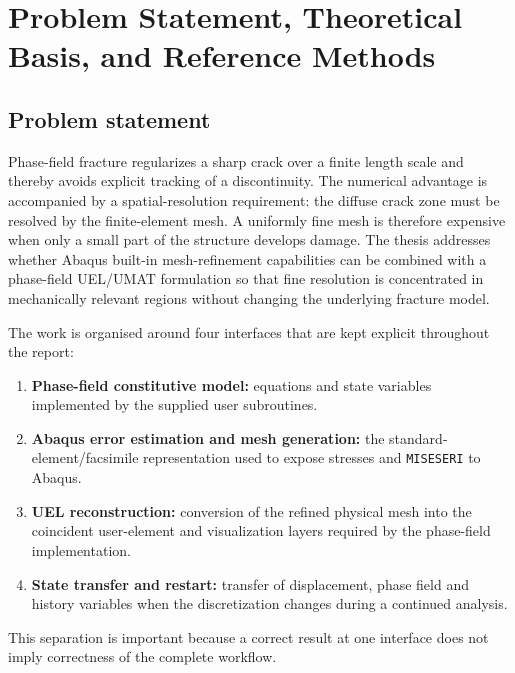 \chapter{Problem Statement, Theoretical Basis, and Reference Methods}
\label{ch:introduction}

\section{Problem statement}
Phase-field fracture regularizes a sharp crack over a finite length scale and thereby avoids explicit tracking of a discontinuity. The numerical advantage is accompanied by a spatial-resolution requirement: the diffuse crack zone must be resolved by the finite-element mesh. A uniformly fine mesh is therefore expensive when only a small part of the structure develops damage. The thesis addresses whether Abaqus built-in mesh-refinement capabilities can be combined with a phase-field UEL/UMAT formulation so that fine resolution is concentrated in mechanically relevant regions without changing the underlying fracture model.

The work is organised around four interfaces that are kept explicit throughout the report:
\begin{enumerate}
  \item \textbf{Phase-field constitutive model:} equations and state variables implemented by the supplied user subroutines.
  \item \textbf{Abaqus error estimation and mesh generation:} the standard-element/facsimile representation used to expose stresses and \texttt{MISESERI} to Abaqus.
  \item \textbf{UEL reconstruction:} conversion of the refined physical mesh into the coincident user-element and visualization layers required by the phase-field implementation.
  \item \textbf{State transfer and restart:} transfer of displacement, phase field and history variables when the discretization changes during a continued analysis.
\end{enumerate}
This separation is important because a correct result at one interface does not imply correctness of the complete workflow.

